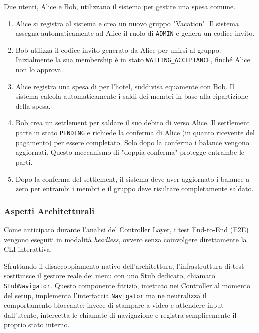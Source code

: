 Due utenti, Alice e Bob, utilizzano il sistema per gestire una spesa comune.
\begin{enumerate}
    \item Alice si registra al sistema e crea un nuovo gruppo "Vacation". Il sistema assegna automaticamente ad Alice il ruolo di \texttt{ADMIN} e genera un codice invito.
    
    \item Bob utilizza il codice invito generato da Alice per unirsi al gruppo. Inizialmente la sua membership è in stato \texttt{WAITING\_ACCEPTANCE}, finché Alice non lo approva.
    
    \item Alice registra una spesa di  per l'hotel, suddivisa equamente con Bob. Il sistema calcola automaticamente i saldi dei membri in base alla ripartizione della spesa.
    
    \item Bob crea un settlement per saldare il suo debito di  verso Alice. Il settlement parte in stato \texttt{PENDING} e richiede la conferma di Alice (in quanto ricevente del pagamento) per essere completato. Solo dopo la conferma i balance vengono aggiornati. Questo meccanismo di "doppia conferma" protegge entrambe le parti.
    
    \item Dopo la conferma del settlement, il sistema deve aver aggiornato i balance a zero per entrambi i membri e il gruppo deve risultare completamente saldato.
\end{enumerate}

\subsubsection{Aspetti Architetturali}
\label{sec:test2e2_architettura}

Come anticipato durante l'analisi del Controller Layer, i test End-to-End (E2E) 
vengono eseguiti in modalità \textit{headless}, ovvero senza coinvolgere direttamente 
la CLI interattiva. 

Sfruttando il disaccoppiamento nativo dell'architettura, l'infrastruttura di test 
sostituisce il gestore reale dei menu con uno Stub dedicato, chiamato \texttt{StubNavigator}. 
Questo componente fittizio, iniettato nei Controller al momento del setup, 
implementa l'interfaccia \texttt{Navigator} ma ne neutralizza il comportamento bloccante: 
invece di stampare a video e attendere input dall'utente, intercetta le chiamate 
di navigazione e registra semplicemente il proprio stato interno.

